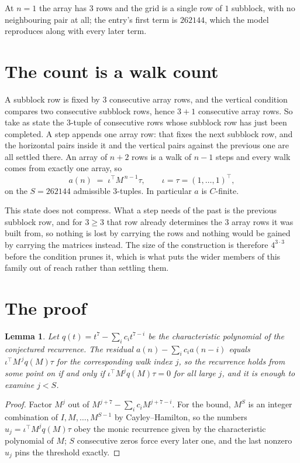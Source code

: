 \documentclass[11pt,a4paper]{article}
\theoremstyle{plain}
\newtheorem{lemma}[theorem]{Lemma}
\theoremstyle{definition}
\begin{document}
At $n=1$ the array has $3$ rows and the grid is a single row of $1$
subblock, with no neighbouring pair at all; the entry's first term is
$262144$, which the model reproduces along with every later term.

\section{The count is a walk count}

A subblock row is fixed by $3$ consecutive array rows, and the vertical condition compares
two consecutive subblock rows, hence $3+1$ consecutive array rows. So take as state the
$3$-tuple of consecutive rows whose subblock row has just been completed. A step appends one
array row: that fixes the next subblock row, and the horizontal pairs inside it and the
vertical pairs against the previous one are all settled there. An array of $n+2$ rows is
a walk of $n-1$ steps and every walk comes from exactly one array, so
\[
a(n)\;=\;\iota^{\!\top}M^{\,n-1}\tau,\qquad\iota=\tau=(1,\dots,1)^{\!\top},
\]
on the $S=262144$ admissible $3$-tuples. In particular $a$ is $C$-finite.

This state does not compress. What a step needs of the past is the previous subblock row, and
for $3\ge3$ that row already determines the $3$ array rows it was built from, so nothing
is lost by carrying the rows and nothing would be gained by carrying the matrices instead. The
size of the construction is therefore $4^{3\cdot3}$ before the condition prunes
it, which is what puts the wider members of this family out of reach rather than settling them.

\section{The proof}

\begin{lemma}\label{lem:crit}
Let $q(t)=t^{7}-\sum_i c_it^{7-i}$ be the characteristic polynomial of the
conjectured recurrence. The residual $a(n)-\sum_ic_ia(n-i)$ equals
$\iota^{\!\top}M^{\,j}q(M)\tau$ for the corresponding walk index $j$, so the recurrence
holds from some point on if and only if $\iota^{\!\top}M^{j}q(M)\tau=0$ for all large $j$,
and it is enough to examine $j<S$.
\end{lemma}

\begin{proof}
Factor $M^{j}$ out of $M^{j+7}-\sum_ic_iM^{j+7-i}$. For the bound, $M^{S}$
is an integer combination of $I,M,\dots,M^{S-1}$ by Cayley--Hamilton, so the numbers
$u_j=\iota^{\!\top}M^{j}q(M)\tau$ obey the monic recurrence given by the characteristic
polynomial of $M$; $S$ consecutive zeros force every later one, and the last nonzero $u_j$
pins the threshold exactly.
\end{proof}
\end{document}
